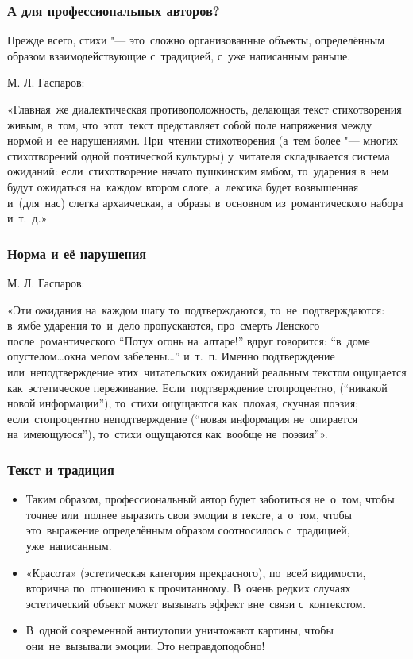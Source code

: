 \documentclass{beamer}
\begin{document}

\begin{frame}
\frametitle{А для профессиональных авторов?}
\begin{flushleft}
Прежде всего, стихи "--- это~сложно организованные объекты, определённым образом взаимодействующие с~традицией, с~уже написанным раньше.
\end{flushleft}


М. Л. Гаспаров:

«Главная~же диалектическая противоположность, делающая текст стихотворения живым, в~том, что~этот~текст представляет собой поле напряжения между нормой и~ее нарушениями. При~чтении стихотворения (а~тем более "--- многих стихотворений одной поэтической культуры) у~читателя складывается система ожиданий: если~стихотворение начато пушкинским ямбом, то~ударения в~нем будут ожидаться на~каждом втором слоге, а~лексика будет возвышенная и~(для~нас) слегка архаическая, а~образы в~основном из~романтического набора и~т.~д.»
\end{frame}


\begin{frame}
\frametitle{Норма и её нарушения}
М. Л. Гаспаров:

«Эти ожидания на~каждом шагу то~подтверждаются, то~не~подтверждаются: в~ямбе ударения то~и~дело пропускаются, про~смерть Ленского после~романтического “Потух огонь на~алтаре!” вдруг говорится: “ в~доме опустелом\dots окна мелом забелены\dots” и~т.~п. Именно подтверждение или~неподтверждение этих~читательских ожиданий реальным текстом ощущается как~эстетическое переживание. Если~подтверждение стопроцентно, (“никакой новой информации”), то~стихи ощущаются как~плохая, скучная поэзия; если~стопроцентно неподтверждение (“новая информация не~опирается на~имеющуюся”), то~стихи ощущаются как~вообще не~поэзия”». 
\end{frame}


\begin{frame}
\frametitle{Текст и традиция}
\begin{itemize}
\item Таким образом, профессиональный автор будет заботиться не~о~том, чтобы точнее или~полнее выразить свои эмоции в тексте, а~о~том, чтобы это~выражение определённым образом соотносилось с~традицией, уже~написанным. 

\item «Красота» (эстетическая категория прекрасного), по~всей видимости, вторична по~отношению к прочитанному. В~очень редких случаях эстетический объект может вызывать эффект вне~связи с~контекстом.

\item В~одной современной антиутопии уничтожают картины, чтобы они~не~вызывали эмоции. Это неправдоподобно!

\end{itemize}

\end{frame}
\end{document}
